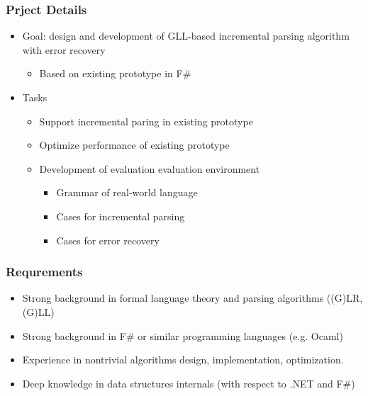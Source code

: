 \documentclass[xcolor=table,aspectratio=169]{beamer}
\begin{document}
\begin{frame}[fragile]
  \frametitle{Prject Details}

  \begin{itemize}
    \item Goal: design and development of GLL-based incremental parsing algorithm with error recovery
    \begin{itemize}
      \item Based on existing prototype in F\#
    \end{itemize}
    \pause
    \item Tasks
    \begin{itemize}
      \item Support incremental paring in existing prototype 
      \item Optimize performance of existing prototype
      \item Development of evaluation evaluation environment
      \begin{itemize}
        \item Grammar of real-world language
        \item Cases for incremental parsing
        \item Cases for error recovery
      \end{itemize} 
    \end{itemize}
    
  \end{itemize}
\end{frame}

\begin{frame}[fragile]
  \frametitle{Requrements}
  \begin{itemize}
    \item Strong background in formal language theory and parsing algorithms ((G)LR, (G)LL)
    \item Strong background in F\# or similar programming languages (e.g. Ocaml)
    \item Experience in nontrivial algorithms design, implementation, optimization.
    \item Deep knowledge in data structures internals (with respect to .NET and F\#) 
  \end{itemize}
 
\end{frame}
\end{document}

